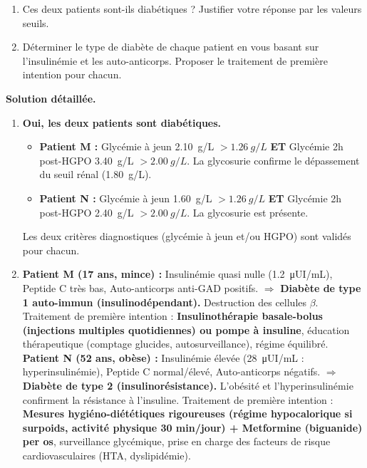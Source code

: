 \documentclass[11pt]{article}
\begin{document}
\begin{exoresolu}
\begin{enumerate}
\item Ces deux patients sont-ils diabétiques ? Justifier votre réponse par les valeurs seuils.
\item Déterminer le type de diabète de chaque patient en vous basant sur l'insulinémie et les auto-anticorps. Proposer le traitement de première intention pour chacun.
\end{enumerate}
\tcblower
\textbf{Solution détaillée.}
\begin{enumerate}
\item \textbf{Oui, les deux patients sont diabétiques.}
      \begin{itemize}
      \item \textbf{Patient M :} Glycémie à jeun \SI{2,10}{g/L} $> \SI{1,26}{g/L}$ \textbf{ET} Glycémie 2h post-HGPO \SI{3,40}{g/L} $> \SI{2,00}{g/L}$. La glycosurie confirme le dépassement du seuil rénal (\SI{1,80}{g/L}).
      \item \textbf{Patient N :} Glycémie à jeun \SI{1,60}{g/L} $> \SI{1,26}{g/L}$ \textbf{ET} Glycémie 2h post-HGPO \SI{2,40}{g/L} $> \SI{2,00}{g/L}$. La glycosurie est présente.
      \end{itemize}
      Les deux critères diagnostiques (glycémie à jeun et/ou HGPO) sont validés pour chacun.
\item \textbf{Patient M (17 ans, mince) :} Insulinémie quasi nulle (\SI{1,2}{\micro UI/mL}), Peptide C très bas, Auto-anticorps anti-GAD positifs. $\Rightarrow$ \textbf{Diabète de type 1 auto-immun (insulinodépendant).} Destruction des cellules $\beta$. Traitement de première intention : \textbf{Insulinothérapie basale-bolus (injections multiples quotidiennes) ou pompe à insuline}, éducation thérapeutique (comptage glucides, autosurveillance), régime équilibré.
      \textbf{Patient N (52 ans, obèse) :} Insulinémie élevée (\SI{28}{\micro UI/mL} : hyperinsulinémie), Peptide C normal/élevé, Auto-anticorps négatifs. $\Rightarrow$ \textbf{Diabète de type 2 (insulinorésistance).} L'obésité et l'hyperinsulinémie confirment la résistance à l'insuline. Traitement de première intention : \textbf{Mesures hygiéno-diététiques rigoureuses (régime hypocalorique si surpoids, activité physique 30 min/jour) + Metformine (biguanide) per os}, surveillance glycémique, prise en charge des facteurs de risque cardiovasculaires (HTA, dyslipidémie).
\end{enumerate}
\end{exoresolu}
\end{document}
